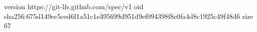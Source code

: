 version https://git-lfs.github.com/spec/v1
oid sha256:675d149ec5ced6f1a51c1e395699d951d9ef094398f8e0fa4d8c1925c49f48d6
size 67
